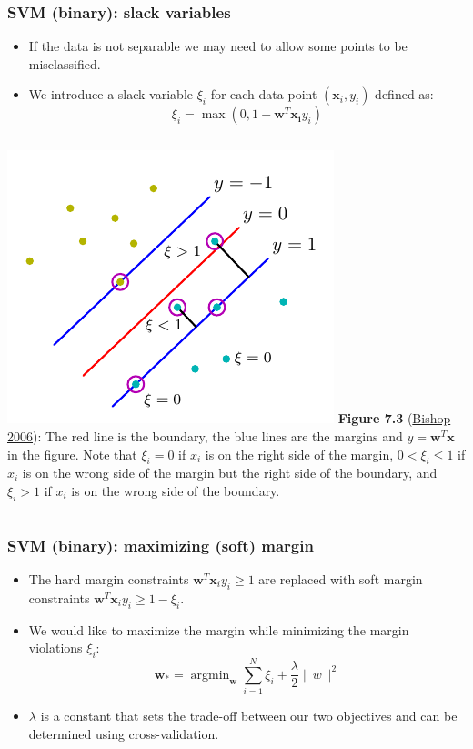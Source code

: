 \documentclass[ignorenonframetext,plain]{beamer}
\DeclareMathOperator*{\argmin}{argmin}
\renewcommand{\vec}{\mathbf}
\begin{document}
\begin{frame}\frametitle{SVM (binary): slack variables} %
\begin{itemize}
\item If the data is not separable we may need to allow some points to
  be misclassified.
\item We introduce a slack variable $\xi_i$ for each data point
  $(\mathbf{x}_i,y_i)$ defined as: \[
  \xi_i = \max(0, 1-\mathbf{w}^T\mathbf{x_i}y_i)
\]
\end{itemize}
\begin{columns}
\includegraphics[width=\textwidth]{images/bishop-fig-7-3.pdf}
\footnotesize {\bf Figure 7.3}
(\href{http://research.microsoft.com/en-us/um/people/cmbishop/prml}{Bishop
  2006}): The red line is the boundary, the blue lines are the margins
and $y=\mathbf{w}^T\mathbf{x}$ in the figure.  Note that $\xi_i=0$ if
$x_i$ is on the right side of the margin, $0<\xi_i\leq 1$ if $x_i$ is
on the wrong side of the margin but the right side of the boundary,
and $\xi_i > 1$ if $x_i$ is on the wrong side of the boundary.
\end{columns}
\end{frame}

\begin{frame}\frametitle{SVM (binary): maximizing (soft) margin}
\begin{itemize}
\item The hard margin constraints $\vec{w}^T\vec{x}_i y_i \geq 1$ are
  replaced with soft margin constraints $\vec{w}^T\vec{x}_i y_i \geq
  1-\xi_i$.
\item We would like to maximize the margin while minimizing the margin
  violations $\xi_i$:
\[
\vec{w}_* = \argmin_\vec{w} \sum_{i=1}^N \xi_i + \frac{\lambda}{2} \|w\|^2
\]
\item $\lambda$ is a constant that sets the trade-off between our two
  objectives and can be determined using cross-validation.
\end{itemize}
\end{frame}
\end{document}
